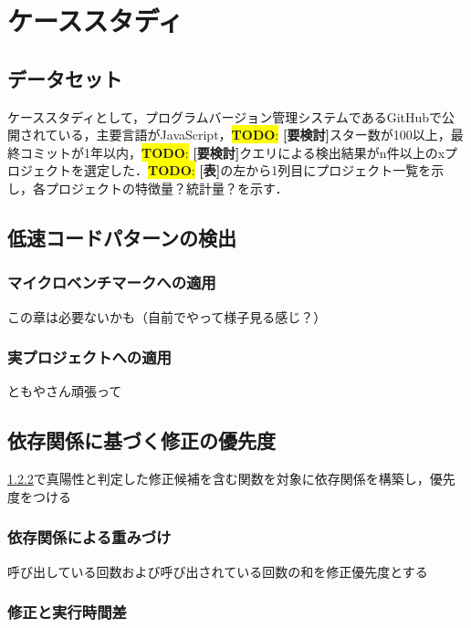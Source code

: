\documentclass[submit,techrep,noauthor]{ipsj}
\newcommand{\todo}[1]{\colorbox{yellow}{{\bf TODO}:}{\color{red} {\textbf{[#1]}}}}
\begin{document}
\section{ケーススタディ}
\label{sec4:format}


\subsection{データセット}

ケーススタディとして，プログラムバージョン管理システムであるGitHubで公開されている，主要言語がJavaScript，\todo{要検討}スター数が100以上，最終コミットが1年以内，\todo{要検討}クエリによる検出結果がn件以上のxプロジェクトを選定した．\todo{表}の左から1列目にプロジェクト一覧を示し，各プロジェクトの特徴量？統計量？を示す．

\subsection{低速コードパターンの検出}

\subsubsection{マイクロベンチマークへの適用}

この章は必要ないかも（自前でやって様子見る感じ？）

\subsubsection{実プロジェクトへの適用}
\label{sec4.2.2:Item}

ともやさん頑張って


\subsection{依存関係に基づく修正の優先度}
\label{sec:Item}

\ref{sec4.2.2:Item}で真陽性と判定した修正候補を含む関数を対象に依存関係を構築し，優先度をつける

\subsubsection{依存関係による重みづけ}

呼び出している回数および呼び出されている回数の和を修正優先度とする

\subsubsection{修正と実行時間差}
\end{document}
